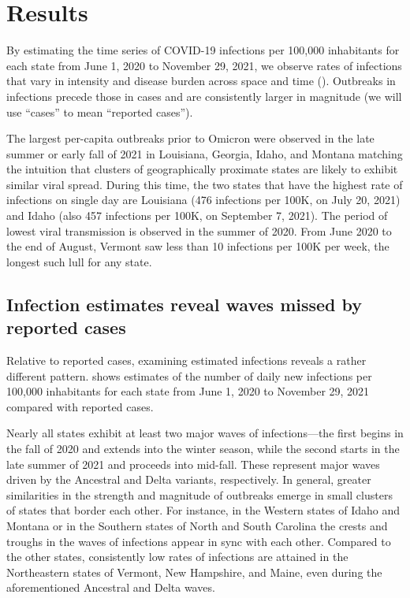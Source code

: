 \section{Results}
\label{sec:results}

By estimating the time series of COVID-19 infections per 100,000 inhabitants
for each \US state from June 1, 2020 to November 29, 2021, we observe rates of
infections that vary in intensity and disease burden across space and time
(). Outbreaks in
infections precede those in cases and are consistently larger in magnitude
(we will use ``cases'' to mean ``reported cases'').

The largest per-capita outbreaks prior to Omicron were observed in the late
summer or early fall of 2021 in Louisiana, Georgia, Idaho, and Montana matching
the intuition that clusters of geographically proximate states are likely to
exhibit similar viral spread. During this time, the two states that have the
highest rate of infections on single day are Louisiana (476 infections per 100K,
on July 20, 2021) and Idaho (also 457 infections per 100K, on September 7,
2021). The period of lowest viral transmission is observed in the summer of
2020. From June 2020 to the end of August, Vermont saw less than 10 infections
per 100K per week, the longest such lull for any state.



\subsection{Infection estimates reveal waves missed by reported cases}
\label{sec:omitted-waves}

Relative to reported cases, examining estimated infections reveals a rather
different pattern.  shows estimates of the number of
daily new infections per 100,000 inhabitants for each \US state from June 1,
2020 to November 29, 2021 compared with reported cases. 

Nearly all states exhibit at least two major waves of infections---the first
begins in the fall of 2020 and extends into the winter season, while the second
starts in the late summer of 2021 and proceeds into mid-fall. These
represent major waves driven by the Ancestral and Delta variants, respectively.
In general, greater similarities in the strength and magnitude of outbreaks
emerge in small clusters of states that border each other. For instance, in the
Western states of Idaho and Montana or in the Southern states of North and South
Carolina the crests and troughs in the waves of infections appear in sync with each
other. Compared to the other states, consistently low rates of infections are
attained in the Northeastern states of Vermont, New Hampshire, and Maine, even
during the aforementioned Ancestral and Delta waves.

